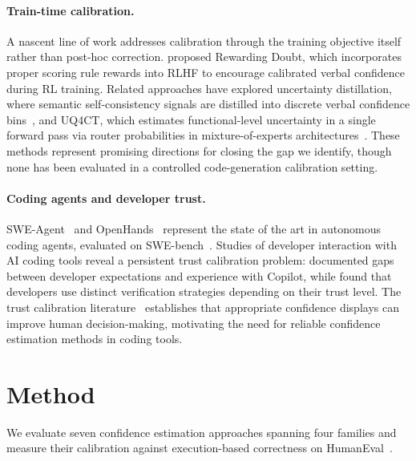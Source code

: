 \documentclass{article}
\begin{document}
\paragraph{Train-time calibration.}
A nascent line of work addresses calibration through the training objective itself rather than post-hoc correction. \citet{stangel2025rewarding} proposed Rewarding Doubt, which incorporates proper scoring rule rewards into RLHF to encourage calibrated verbal confidence during RL training. Related approaches have explored uncertainty distillation, where semantic self-consistency signals are distilled into discrete verbal confidence bins~\citep{xiong2024uncertainty}, and UQ4CT, which estimates functional-level uncertainty in a single forward pass via router probabilities in mixture-of-experts architectures~\citep{yao2024uq4ct}. These methods represent promising directions for closing the gap we identify, though none has been evaluated in a controlled code-generation calibration setting.

\paragraph{Coding agents and developer trust.}
SWE-Agent~\citep{yang2024swe} and OpenHands~\citep{wang2024opendevin} represent the state of the art in autonomous coding agents, evaluated on SWE-bench~\citep{jimenez2024swe}. Studies of developer interaction with AI coding tools reveal a persistent trust calibration problem: \citet{vaithilingam2022expectation} documented gaps between developer expectations and experience with Copilot, while \citet{mozannar2024reading} found that developers use distinct verification strategies depending on their trust level. The trust calibration literature~\citep{lee2004trust, yin2019understanding, zhang2020effect, bansal2021does} establishes that appropriate confidence displays can improve human decision-making, motivating the need for reliable confidence estimation methods in coding tools.

\section{Method}
\label{sec:method}

We evaluate seven confidence estimation approaches spanning four families and measure their calibration against execution-based correctness on HumanEval~\citep{chen2021evaluating}.
\end{document}
